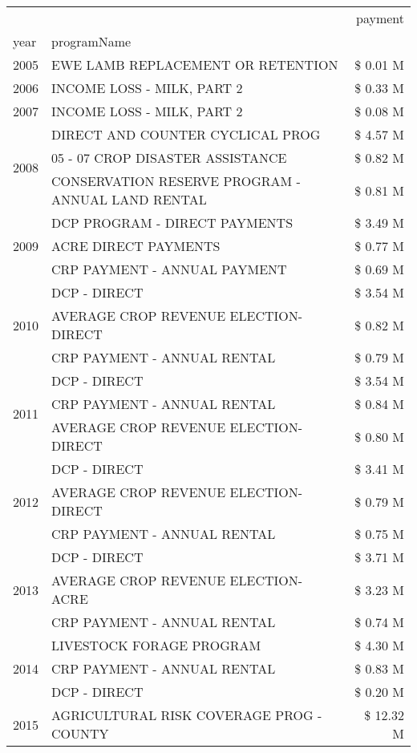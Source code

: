 \begin{tabular}{llr}
\toprule
 &  & payment \\
year & programName &  \\
\midrule
2005 & EWE LAMB REPLACEMENT OR RETENTION & \$ 0.01 M \\
\cline{1-3}
2006 & INCOME LOSS - MILK, PART 2 & \$ 0.33 M \\
\cline{1-3}
2007 & INCOME LOSS - MILK, PART 2 & \$ 0.08 M \\
\cline{1-3}
\multirow[t]{3}{*}{2008} & DIRECT AND COUNTER CYCLICAL PROG & \$ 4.57 M \\
 & 05 - 07 CROP DISASTER ASSISTANCE & \$ 0.82 M \\
 & CONSERVATION RESERVE PROGRAM - ANNUAL LAND RENTAL & \$ 0.81 M \\
\cline{1-3}
\multirow[t]{3}{*}{2009} & DCP PROGRAM - DIRECT PAYMENTS & \$ 3.49 M \\
 & ACRE DIRECT PAYMENTS & \$ 0.77 M \\
 & CRP PAYMENT - ANNUAL PAYMENT & \$ 0.69 M \\
\cline{1-3}
\multirow[t]{3}{*}{2010} & DCP - DIRECT & \$ 3.54 M \\
 & AVERAGE CROP REVENUE ELECTION-DIRECT & \$ 0.82 M \\
 & CRP PAYMENT - ANNUAL RENTAL & \$ 0.79 M \\
\cline{1-3}
\multirow[t]{3}{*}{2011} & DCP - DIRECT & \$ 3.54 M \\
 & CRP PAYMENT - ANNUAL RENTAL & \$ 0.84 M \\
 & AVERAGE CROP REVENUE ELECTION-DIRECT & \$ 0.80 M \\
\cline{1-3}
\multirow[t]{3}{*}{2012} & DCP - DIRECT & \$ 3.41 M \\
 & AVERAGE CROP REVENUE ELECTION-DIRECT & \$ 0.79 M \\
 & CRP PAYMENT - ANNUAL RENTAL & \$ 0.75 M \\
\cline{1-3}
\multirow[t]{3}{*}{2013} & DCP - DIRECT & \$ 3.71 M \\
 & AVERAGE CROP REVENUE ELECTION-ACRE & \$ 3.23 M \\
 & CRP PAYMENT - ANNUAL RENTAL & \$ 0.74 M \\
\cline{1-3}
\multirow[t]{3}{*}{2014} & LIVESTOCK FORAGE PROGRAM & \$ 4.30 M \\
 & CRP PAYMENT - ANNUAL RENTAL & \$ 0.83 M \\
 & DCP - DIRECT & \$ 0.20 M \\
\cline{1-3}
\multirow[t]{3}{*}{2015} & AGRICULTURAL RISK COVERAGE PROG - COUNTY & \$ 12.32 M \\

\end{tabular}
